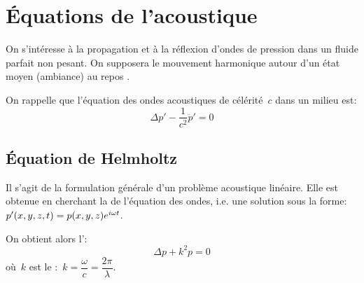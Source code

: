 \medskip
\section{Équations de l'acoustique}\label{Sec-EqFblAcou}
On s'intéresse à la propagation et à la réflexion d'ondes de pression dans un fluide parfait non pesant. On supposera le mouvement harmonique autour d'un état moyen (ambiance) au repos .

\medskip
On rappelle que l'équation des ondes acoustiques de célérité~$c$ dans un milieu est:
\begin{equation}
\Delta p' - \dfrac1{c^2} \ddot{p}' = 0
\end{equation}

\medskip
\subsection{Équation de Helmholtz}
Il s'agit de la formulation générale d'un problème acoustique linéaire. Elle est obtenue en cherchant la  de l'équation des ondes, i.e. une solution sous la forme:~$p'(x,y,z,t)=p(x,y,z)\mathrm \mathrm{e}^{i\omega t}$. 

On obtient alors l':
\begin{equation}\label{Eq-Helm} \Delta p + k^2 p=0 \end{equation}
où~$k$ est le :~$k=\dfrac\omega{c}=\dfrac{2\pi}\lambda$.

\medskip
